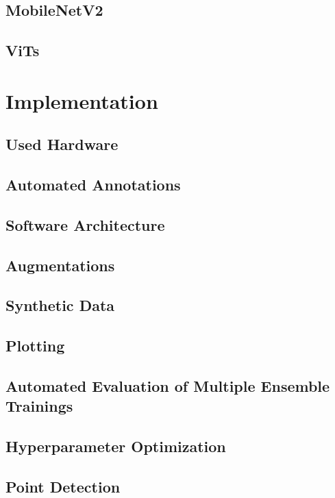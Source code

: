 \documentclass[10pt]{book}
\begin{document}
\section{MobileNetV2}

\section{ViTs}

\chapter{Implementation}
\label{chap:implement}

\section{Used Hardware}

\section{Automated Annotations}

\section{Software Architecture}

\section{Augmentations}

\section{Synthetic Data}

\section{Plotting}

\section{Automated Evaluation of Multiple Ensemble Trainings}

\section{Hyperparameter Optimization}

\section{Point Detection}
\end{document}
